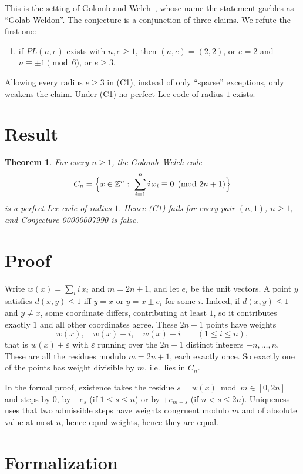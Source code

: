 \documentclass[11pt]{article}
\theoremstyle{plain}
\newtheorem{theorem}{Theorem}
\theoremstyle{definition}
\theoremstyle{remark}
\newcommand{\Z}{\mathbb Z}
\begin{document}
This is the setting of Golomb and Welch~\cite{gw}, whose name the statement garbles as
``Golab-Weldon''. The conjecture is a conjunction of three claims. We refute the first
one:
\begin{enumerate}
\item[(C1)] if $PL(n,e)$ exists with $n,e\ge1$, then $(n,e)=(2,2)$, or $e=2$ and
  $n\equiv\pm1\pmod6$, or $e\ge3$.
\end{enumerate}
Allowing every radius $e\ge3$ in (C1), instead of only ``sparse'' exceptions, only
weakens the claim. Under (C1) no perfect Lee code of radius $1$ exists.

\section{Result}

\begin{theorem}\label{thm:main}
For every $n\ge1$, the Golomb--Welch code
\[
C_n=\Bigl\{x\in\Z^n:\ \sum_{i=1}^n i\,x_i\equiv0\pmod{2n+1}\Bigr\}
\]
is a perfect Lee code of radius $1$. Hence (C1) fails for every pair $(n,1)$, $n\ge1$,
and Conjecture 00000007990 is false.
\end{theorem}

\section{Proof}

Write $w(x)=\sum_i i\,x_i$ and $m=2n+1$, and let $e_i$ be the unit vectors. A point $y$
satisfies $d(x,y)\le1$ iff $y=x$ or $y=x\pm e_i$ for some $i$. Indeed, if
$d(x,y)\le1$ and $y\ne x$, some coordinate differs, contributing at least $1$, so it
contributes exactly $1$ and all other coordinates agree. These $2n+1$ points have
weights
\[
w(x),\quad w(x)+i,\quad w(x)-i\qquad(1\le i\le n),
\]
that is $w(x)+\varepsilon$ with $\varepsilon$ running over the $2n+1$ distinct integers
$-n,\dots,n$. These are all the residues modulo $m=2n+1$, each exactly once. So
exactly one of the points has weight divisible by $m$, i.e.\ lies in $C_n$.

In the formal proof, existence takes the residue $s=w(x)\bmod m\in[0,2n]$ and steps by
$0$, by $-e_s$ (if $1\le s\le n$) or by $+e_{m-s}$ (if $n<s\le2n$). Uniqueness uses
that two admissible steps have weights congruent modulo $m$ and of absolute value at
most $n$, hence equal weights, hence they are equal.

\section{Formalization}
\end{document}
